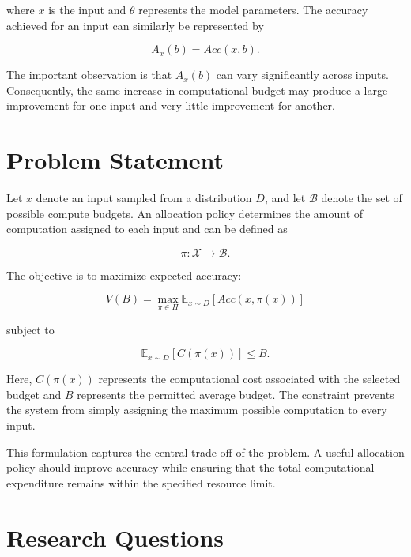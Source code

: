 \documentclass[12pt,a4paper,titlepage]{report}
\begin{document}
where $x$ is the input and $\theta$ represents the model parameters. The accuracy achieved for an input can similarly be represented by

\begin{equation}
A_x(b)=Acc(x,b).
\end{equation}

The important observation is that $A_x(b)$ can vary significantly across inputs. Consequently, the same increase in computational budget may produce a large improvement for one input and very little improvement for another.

\section{Problem Statement}

Let $x$ denote an input sampled from a distribution $D$, and let $\mathcal{B}$ denote the set of possible compute budgets. An allocation policy determines the amount of computation assigned to each input and can be defined as

\begin{equation}
\pi:\mathcal{X}\rightarrow\mathcal{B}.
\end{equation}

The objective is to maximize expected accuracy:

\begin{equation}
V(B)
=
\max_{\pi\in\Pi}
\mathbb{E}_{x\sim D}
[Acc(x,\pi(x))]
\end{equation}

subject to

\begin{equation}
\mathbb{E}_{x\sim D}
[C(\pi(x))]
\leq B.
\end{equation}

Here, $C(\pi(x))$ represents the computational cost associated with the selected budget and $B$ represents the permitted average budget. The constraint prevents the system from simply assigning the maximum possible computation to every input.

This formulation captures the central trade-off of the problem. A useful allocation policy should improve accuracy while ensuring that the total computational expenditure remains within the specified resource limit.

\section{Research Questions}
\end{document}
